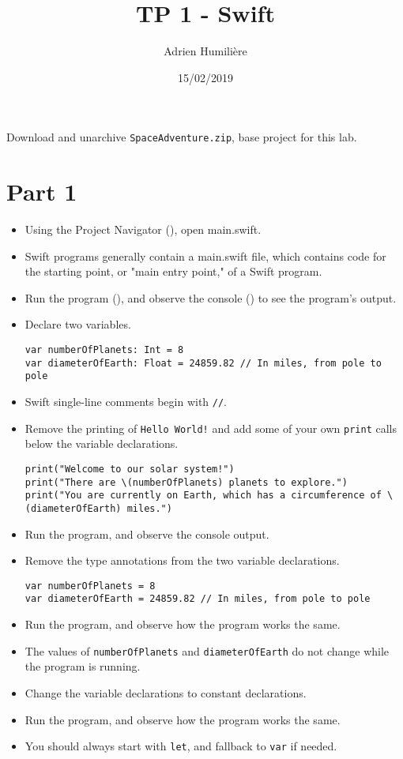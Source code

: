 \documentclass[a4paper,11pt]{scrartcl}
\begin{document}
\newcommand{\mytitle}{\textsf{\textbf{TP 1 - Swift}}}
\title{\mytitle}
\author{Adrien Humilière}
\date{15/02/2019}

\maketitle

Download and unarchive \texttt{SpaceAdventure.zip}, base project for this lab.

\section*{Part 1}

\begin{itemize}
\item Using the Project Navigator (), open main.swift.
\item Swift programs generally contain a main.swift file, which contains code for the starting point, or "main entry point," of a Swift program.
\item Run the program (), and observe the console () to see the program's output.
\item Declare two variables.
\begin{lstlisting}
var numberOfPlanets: Int = 8
var diameterOfEarth: Float = 24859.82 // In miles, from pole to pole
\end{lstlisting}
\item Swift single-line comments begin with \texttt{//}.
\item Remove the printing of \texttt{Hello World!} and add some of your own \texttt{print} calls below the variable declarations.
\begin{lstlisting}
print("Welcome to our solar system!")
print("There are \(numberOfPlanets) planets to explore.")
print("You are currently on Earth, which has a circumference of \(diameterOfEarth) miles.")
\end{lstlisting}
\item Run the program, and observe the console output.
\item Remove the type annotations from the two variable declarations.
\begin{lstlisting}
var numberOfPlanets = 8
var diameterOfEarth = 24859.82 // In miles, from pole to pole
\end{lstlisting}
\item Run the program, and observe how the program works the same.
\item The values of \texttt{numberOfPlanets} and \texttt{diameterOfEarth} do not change while the program is running.
\item Change the variable declarations to constant declarations.
\item Run the program, and observe how the program works the same.
\item You should always start with \texttt{let}, and fallback to \texttt{var} if needed.
\end{itemize}
\end{document}
